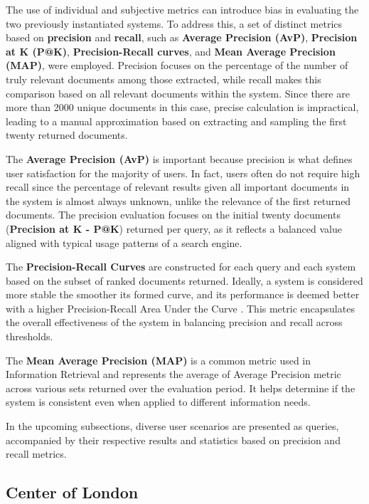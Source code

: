 \documentclass[sigconf]{acmart}
\begin{document}
The use of individual and subjective metrics can introduce bias in evaluating the two previously instantiated systems. To address this, a set of distinct metrics based on \textbf{precision} and \textbf{recall}, such as \textbf{Average Precision (AvP)}, \textbf{Precision at K (P@K)}, \textbf{Precision-Recall curves}, and \textbf{Mean Average Precision (MAP)}, were employed. Precision focuses on the percentage of the number of truly relevant documents among those extracted, while recall makes this comparison based on all relevant documents within the system. Since there are more than 2000 unique documents in this case, precise calculation is impractical, leading to a manual approximation based on extracting and sampling the first twenty returned documents.

The \textbf{Average Precision (AvP)} is important because precision is what defines user satisfaction for the majority of users. In fact, users often do not require high recall since the percentage of relevant results given all important documents in the system is almost always unknown, unlike the relevance of the first returned documents. The precision evaluation focuses on the initial twenty documents (\textbf{Precision at K - P@K}) returned per query, as it reflects a balanced value aligned with typical usage patterns of a search engine.

The \textbf{Precision-Recall Curves} are constructed for each query and each system based on the subset of ranked documents returned. Ideally, a system is considered more stable the smoother its formed curve, and its performance is deemed better with a higher Precision-Recall Area Under the Curve \cite{Precision_Recall}. This metric encapsulates the overall effectiveness of the system in balancing precision and recall across thresholds.

The \textbf{Mean Average Precision (MAP)} is a common metric used in Information Retrieval and represents the average of Average Precision metric across various sets returned over the evaluation period. It helps determine if the system is consistent even when applied to different information needs.

In the upcoming subsections, diverse user scenarios are presented as queries, accompanied by their respective results and statistics based on precision and recall metrics.

\renewcommand{\thesubsection}{\Alph{subsection}}

\subsection{Center of London}
\end{document}

